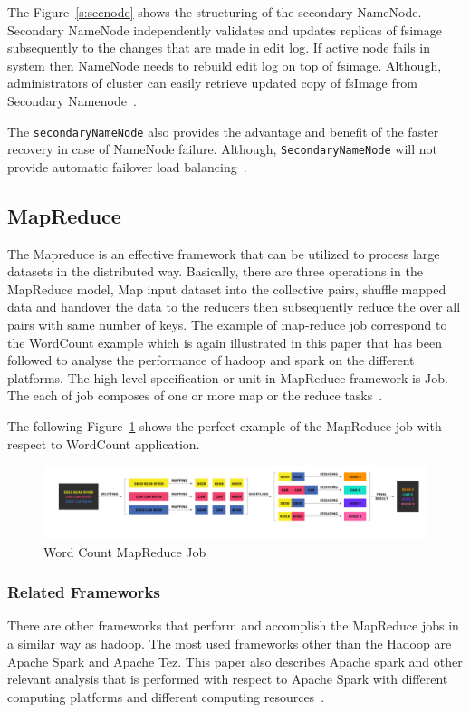 The Figure~\ref{s:secnode} shows the structuring of the secondary NameNode. 
Secondary NameNode independently validates and 
updates replicas of fsimage subsequently to the changes 
that are made in edit log. If active node fails in
system then NameNode needs to rebuild edit 
log on top of fsimage. Although, administrators of  
cluster can easily retrieve updated copy of
fsImage from Secondary 
Namenode~\cite{hid-sp18-412-hadoop-architecture-overview}.

The \verb|secondaryNameNode| also provides the advantage and 
benefit of the faster recovery in case of NameNode failure. 
Although, \verb|SecondaryNameNode|
will not provide automatic failover 
load balancing~\cite{hid-sp18-412-hadoop-architecture-overview}.


\subsection{MapReduce}
The Mapreduce is an effective framework that can be 
utilized to process large datasets in the distributed way. 
Basically, there are three operations in the MapReduce model, 
Map input dataset into the collective pairs, 
shuffle mapped data and handover the data to the 
reducers then subsequently reduce the over all pairs 
with same number of keys. The example of 
map-reduce job correspond to the WordCount example 
which is again illustrated in this paper that has 
been followed to analyse the performance of hadoop 
and spark on the different platforms. 
The high-level specification or unit in 
MapReduce framework is Job. The each of 
job composes of one or 
more map or the reduce tasks~\cite{hid-sp18-412-hadoop-architecture-overview}. 

The following Figure~\ref{s:mapreduce} 
shows the perfect example of the 
MapReduce job with respect to WordCount application.

\begin{figure}[!ht]
\centering\includegraphics[width=\textwidth]{images/WordCountMapReduce.png}
\caption{Word Count 
MapReduce 
Job~\cite{hid-sp18-412-hadoop-architecture-overview}}\label{s:mapreduce}
\end{figure}

\subsubsection{Related Frameworks}
There are other frameworks that perform and accomplish the 
MapReduce jobs in a similar way as hadoop. 
The most used frameworks 
other than the Hadoop are Apache Spark and Apache Tez. 
This paper also describes Apache spark and other relevant 
analysis that is performed with respect to Apache Spark 
with different computing platforms and
different computing resources~\cite{hid-sp18-412-hadoop-architecture-overview}.

